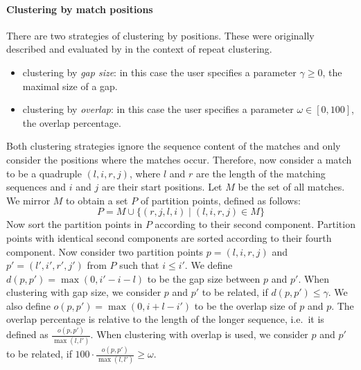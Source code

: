 \documentclass[12pt]{article}
\begin{document}
\paragraph{Clustering by match positions}
There are two strategies of clustering by positions. These were
originally described and evaluated by
\cite{VOL:HAA:SAL:2001} in the context of repeat clustering.

\begin{itemize}
\item
clustering by \emph{gap size}: in this case the user specifies a
parameter \(\gamma\geq 0\), the maximal size of a gap.
\item
clustering by \emph{overlap}: in this case the user specifies a 
parameter \(\omega\in[0,100]\), the overlap percentage.
\end{itemize}
Both clustering strategies ignore the sequence content of the matches
and only consider the positions where the matches occur.
Therefore, now consider a match to be a quadruple
$(l,i,r,j)$, where \(l\) and \(r\) are the length of the matching
sequences and \(i\) and \(j\) are their start positions.
Let \(M\) be the set of all matches. We mirror \(M\) to obtain
a set \(P\) of partition points, defined as follows:
\[P = M \cup \{(r,j,l,i) \mid (l,i,r,j) \in M\}\]
Now sort the partition points in \(P\) according to their second component.
Partition points with identical second components are sorted according
to their fourth component. Now consider two partition points
$p=(l,i,r,j)$ and $p'=(l',i',r',j')$ from \(P\) such that \(i\leq i'\).
We define \(d(p,p')=\max(0,i'-i-l)\) to be the gap size between \(p\) and 
\(p'\). When clustering with gap size, we consider \(p\) and \(p'\)
to be related, if \(d(p,p')\leq\gamma\).
We also define \(o(p,p')=\max(0,i+l-i')\) to be the overlap size
of \(p\) and \(p\). The overlap percentage is relative to the length of
the longer sequence, i.e.\ it is defined as 
\(\frac{o(p,p')}{\max(l,l')}\).
When clustering with overlap is used, we
consider \(p\) and \(p'\) to be related, if
\(100\cdot \frac{o(p,p')}{\max(l,l')}\geq\omega\).



\end{document}
